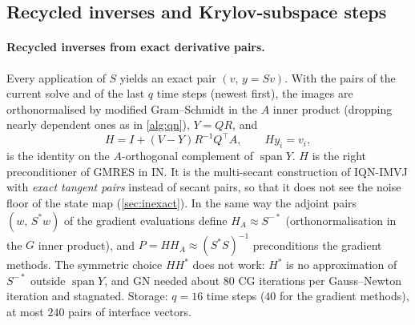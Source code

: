 \documentclass[11pt,a4paper]{article}
\theoremstyle{definition}
\theoremstyle{remark}
\begin{document}
\subsection{Recycled inverses and Krylov-subspace steps}\label{sec:fast_ingredients}

\paragraph{Recycled inverses from exact derivative pairs.} Every application of $S$ yields an
exact pair $(v,\,y=Sv)$. With the pairs of the current solve and of the last $q$ time steps
(newest first), the images are orthonormalised by modified Gram--Schmidt in the $A$ inner product
(dropping nearly dependent ones as in \cref{alg:qn}), $Y=QR$, and
\begin{equation}\label{eq:recycled}
  H = I + (V-Y)R^{-1}Q^{\top}A, \qquad H y_i = v_i,
\end{equation}
is the identity on the $A$-orthogonal complement of $\operatorname{span}Y$. $H$ is the right
preconditioner of GMRES in IN. It is the multi-secant construction of IQN-IMVJ \cite{Bogaers2014}
with \emph{exact tangent pairs} instead of secant pairs, so that it does not see the noise floor of
the state map (\cref{sec:inexact}). In the same way the adjoint pairs $(w,\,S^*w)$ of the gradient
evaluations define $H_A\approx S^{-*}$ (orthonormalisation in the $G$ inner product), and
$P=H H_A\approx(S^*S)^{-1}$ preconditions the gradient methods. The symmetric choice $HH^*$ does
not work: $H^*$ is no approximation of $S^{-*}$ outside $\operatorname{span}Y$, and GN needed about
$80$ CG iterations per Gauss--Newton iteration and stagnated. Storage: $q=16$ time steps
($40$ for the gradient methods), at most $240$ pairs of interface vectors.
\end{document}
